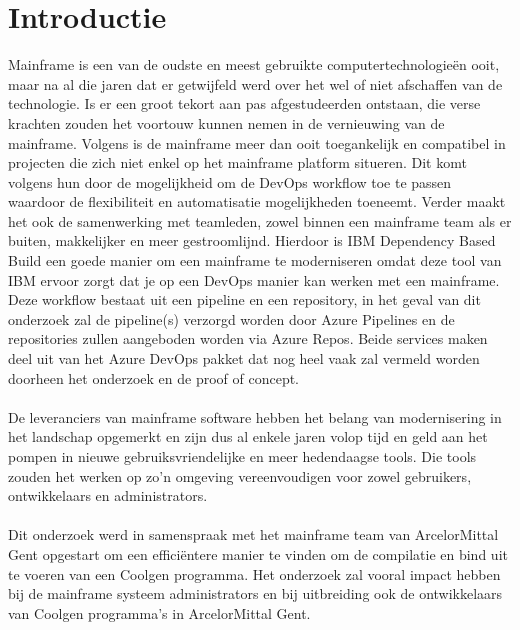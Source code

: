 
\section{Introductie}%
\label{sec:introductie}

Mainframe is een van de oudste en meest gebruikte computertechnologieën ooit, maar na al die jaren dat er getwijfeld werd over het wel of niet afschaffen van de technologie.
Is er een groot tekort aan pas afgestudeerden ontstaan, die verse krachten zouden het voortouw kunnen nemen in de vernieuwing van de mainframe.
Volgens \textcite{Broadcom2024} is de mainframe meer dan ooit toegankelijk en compatibel in projecten die zich niet enkel op het mainframe platform situeren. Dit komt volgens hun door de mogelijkheid om de DevOps workflow toe te passen waardoor de flexibiliteit en automatisatie mogelijkheden toeneemt. Verder maakt het ook de samenwerking met teamleden, zowel binnen een mainframe team als er buiten, makkelijker en meer gestroomlijnd. Hierdoor is IBM Dependency Based Build een goede manier om een mainframe te moderniseren omdat deze tool van IBM ervoor zorgt dat je op een DevOps manier kan werken met een mainframe.
Deze workflow bestaat uit een pipeline en een repository, in het geval van dit onderzoek zal de pipeline(s) verzorgd worden door Azure Pipelines en de repositories zullen aangeboden worden via Azure Repos.
Beide services maken deel uit van het Azure DevOps pakket dat nog heel vaak zal vermeld worden doorheen het onderzoek en de proof of concept.
\\ \\
De leveranciers van mainframe software hebben het belang van modernisering in het landschap opgemerkt en zijn dus al enkele jaren volop tijd en geld aan het pompen in nieuwe gebruiksvriendelijke en meer hedendaagse tools.
Die tools zouden het werken op zo'n omgeving vereenvoudigen voor zowel gebruikers, ontwikkelaars en administrators.
\\ \\
Dit onderzoek werd in samenspraak met het mainframe team van ArcelorMittal Gent opgestart om een efficiëntere manier te vinden om de compilatie en bind uit te voeren van een Coolgen programma. Het onderzoek zal vooral impact hebben bij de mainframe systeem administrators en bij uitbreiding ook de ontwikkelaars van Coolgen programma's in ArcelorMittal Gent.
\\ \\
